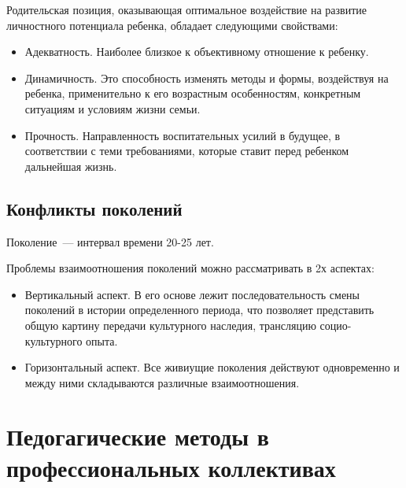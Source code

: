 Родительская позиция, оказывающая оптимальное воздействие на развитие личностного потенциала ребенка, обладает следующими свойствами:
\begin{itemize}
	\item Адекватность. Наиболее близкое к объективному отношение к ребенку.
	\item Динамичность. Это способность изменять методы и формы, воздействуя на ребенка, применительно к его возрастным особенностям, конкретным ситуациям и условиям жизни семьи.
	\item Прочность. Направленность воспитательных усилий в будущее, в соответствии с теми требованиями, которые ставит перед ребенком дальнейшая жизнь.
\end{itemize}

\subsection{Конфликты поколений}
Поколение~--- интервал времени 20-25 лет.

Проблемы взаимоотношения поколений можно рассматривать в 2х аспектах: 
\begin{itemize}
	\item Вертикальный аспект. В его основе лежит последовательность смены поколений в истории определенного периода, что позволяет представить общую картину передачи культурного наследия, трансляцию социо-культурного опыта.
	\item Горизонтальный аспект. Все живиущие поколения действуют одновременно и между ними складываются различные взаимоотношения.
\end{itemize}

\section{Педогагические методы в профессиональных коллективах}
